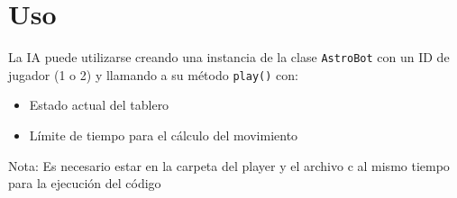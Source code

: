 \documentclass{article}
\begin{document}
\section{Uso}
La IA puede utilizarse creando una instancia de la clase \texttt{AstroBot} con un ID de jugador (1 o 2) y llamando a su método \texttt{play()} con:
\begin{itemize}
    \item Estado actual del tablero
    \item Límite de tiempo para el cálculo del movimiento
\end{itemize}
Nota: Es necesario estar en la carpeta del player y el archivo c al mismo tiempo para la ejecución del código
\end{document}
